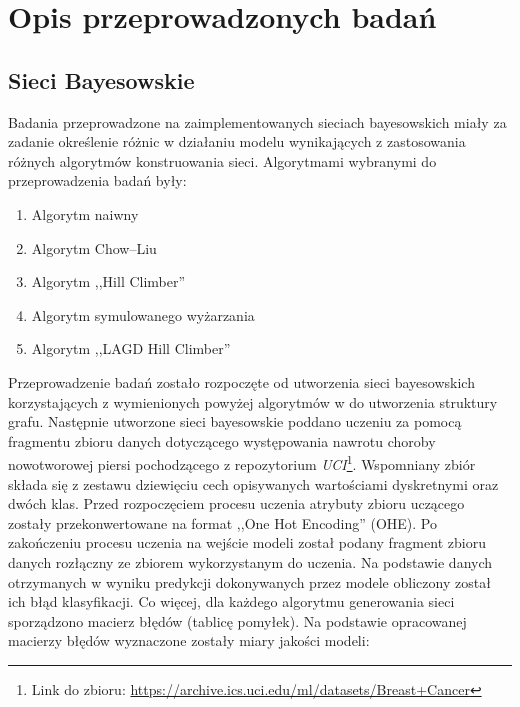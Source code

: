 \newpage

\section{Opis przeprowadzonych badań}

\subsection{Sieci Bayesowskie}
Badania przeprowadzone na zaimplementowanych sieciach bayesowskich miały za zadanie określenie różnic w działaniu modelu wynikających z zastosowania różnych algorytmów konstruowania sieci.\newline
Algorytmami wybranymi do przeprowadzenia badań były:
\begin{enumerate}
\item Algorytm naiwny
\item Algorytm Chow–Liu
\item Algorytm ,,Hill Climber''
\item Algorytm symulowanego wyżarzania
\item Algorytm ,,LAGD Hill Climber''
\end{enumerate}
Przeprowadzenie badań zostało rozpoczęte od utworzenia sieci bayesowskich korzystających z wymienionych powyżej algorytmów w do utworzenia struktury grafu.\newline
Następnie utworzone sieci bayesowskie poddano uczeniu za pomocą fragmentu zbioru danych dotyczącego występowania nawrotu choroby nowotworowej piersi pochodzącego z repozytorium \textit{UCI}\footnote{Link do zbioru: \url{https://archive.ics.uci.edu/ml/datasets/Breast+Cancer}}. Wspomniany zbiór składa się z zestawu dziewięciu cech opisywanych wartościami dyskretnymi oraz dwóch klas.\newline
Przed rozpoczęciem procesu uczenia atrybuty zbioru uczącego zostały przekonwertowane na format ,,One Hot Encoding'' (OHE). \newline
Po zakończeniu procesu uczenia na wejście modeli został podany fragment zbioru danych rozłączny ze zbiorem wykorzystanym do uczenia. Na podstawie danych otrzymanych w wyniku predykcji dokonywanych przez modele obliczony został ich błąd klasyfikacji. Co więcej, dla każdego algorytmu generowania sieci sporządzono macierz błędów (tablicę pomyłek).  \newline
Na podstawie opracowanej macierzy błędów wyznaczone zostały miary jakości modeli:
